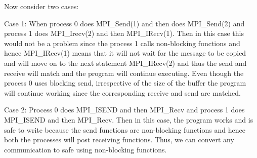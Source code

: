 \documentclass[12pt]{article}
\begin{document}
Now consider two cases:

Case 1: When process 0 does MPI\_Send(1) and then does MPI\_Send(2) and process 1 does MPI\_Irecv(2) and then MPI\_IRecv(1). Then in this case this would not be a problem since the process 1 calls non-blocking functions and hence MPI\_IRecv(1) means that it will not wait for the message to be copied and will move on to the next statement MPI\_IRecv(2) and thus the send and receive will match and the program will continue executing. Even though the process 0 uses blocking send, irrespective of the size of the buffer the program will continue working since the corresponding receive and send are matched.

Case 2: Process 0 does MPI\_ISEND and then MPI\_Recv and process 1 does MPI\_ISEND and then MPI\_Recv. Then in this case, the program works and is safe to write because the send functions are non-blocking functions and hence both the processes will post receiving functions. Thus, we can convert any communication to safe using non-blocking functions.
\end{document}
